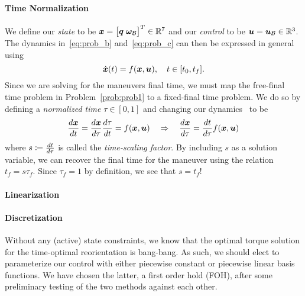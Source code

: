 \documentclass[10pt]{article}
\begin{document}
\paragraph{Time Normalization}
We define our \textit{state} to be $\bm{x} = \big[ \bm{q} \; \bm{\omega}_{\mathcal{B}} \big]^T \in {\mathbb{R}}^7$ and our \textit{control} to be $\bm{u} = \bm{u}_{\mathcal{B}} \in {\mathbb{R}}^3$. The dynamics in~\eqref{eq:prob_b} and~\eqref{eq:prob_c} can then be expressed in general using
\begin{equation}
\dot{\bm{x}}(t) = f(\bm{x},\bm{u}), \quad t \in [t_0,t_f].
\label{eq:dynamics_general}
\end{equation}
Since we are solving for the maneuvers final time, we must map the free-final time problem in Problem~\ref{prob:prob1} to a fixed-final time problem. We do so by defining a \textit{normalized time} $\tau\in[0,1]$ and changing our dynamics~ to be
\begin{equation}
\frac{d \bm{x}}{d t} = \frac{d \bm{x}}{d \tau}\frac{d \tau}{d t} = f(\bm{x},\bm{u}) \quad \Rightarrow \quad \frac{d \bm{x}}{d \tau} = \frac{d t}{d \tau} f(\bm{x},\bm{u})
\label{eq:dynamics_normalized}
\end{equation}
where $s \coloneqq \frac{d t}{d \tau}$ is called the \textit{time-scaling factor}. By including $s$ as a solution variable, we can recover the final time for the maneuver using the relation $t_f = s \tau_f$. Since $\tau_f = 1$ by definition, we see that $s = t_f$!

\paragraph{Linearization}


\paragraph{Discretization}

Without any (active) state constraints, we know that the optimal torque solution for the time-optimal reorientation is bang-bang. As such, we should elect to parameterize our control with either piecewise constant or piecewise linear basis functions. We have chosen the latter, a first order hold (FOH), after some preliminary testing of the two methods against each other. 
\end{document}
